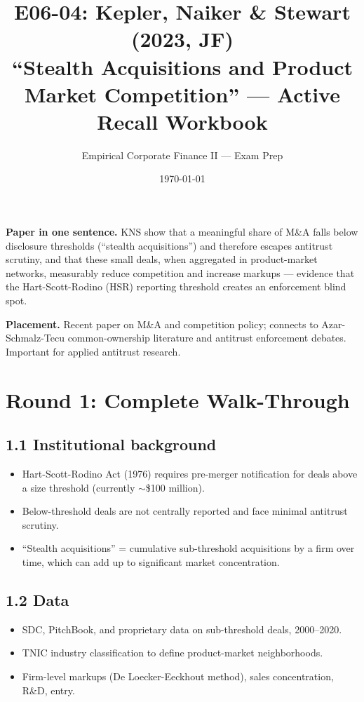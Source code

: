 \documentclass[11pt]{article}
\title{E06-04: Kepler, Naiker \& Stewart (2023, JF) \\
\large ``Stealth Acquisitions and Product Market Competition'' --- Active Recall Workbook}
\author{Empirical Corporate Finance II --- Exam Prep}
\date{\today}
\begin{document}
\maketitle

\begin{keybox}
\textbf{Paper in one sentence.} KNS show that a meaningful share of M\&A falls below disclosure thresholds (``stealth acquisitions'') and therefore escapes antitrust scrutiny, and that these small deals, when aggregated in product-market networks, measurably reduce competition and increase markups --- evidence that the Hart-Scott-Rodino (HSR) reporting threshold creates an enforcement blind spot.

\textbf{Placement.} Recent paper on M\&A and competition policy; connects to Azar-Schmalz-Tecu common-ownership literature and antitrust enforcement debates. Important for applied antitrust research.
\end{keybox}

\section*{Round 1: Complete Walk-Through}

\subsection*{1.1 Institutional background}
\begin{itemize}
\item Hart-Scott-Rodino Act (1976) requires pre-merger notification for deals above a size threshold (currently $\sim$\$100 million).
\item Below-threshold deals are not centrally reported and face minimal antitrust scrutiny.
\item ``Stealth acquisitions'' = cumulative sub-threshold acquisitions by a firm over time, which can add up to significant market concentration.
\end{itemize}

\subsection*{1.2 Data}
\begin{itemize}
\item SDC, PitchBook, and proprietary data on sub-threshold deals, 2000--2020.
\item TNIC industry classification to define product-market neighborhoods.
\item Firm-level markups (De Loecker-Eeckhout method), sales concentration, R\&D, entry.
\end{itemize}
\end{document}
